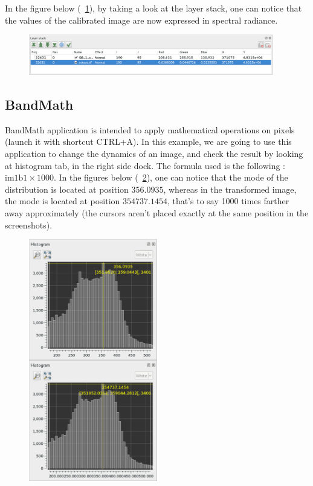 In the figure below (~\ref{fig:OC}), by taking a look at the layer stack, one can notice that the values of the calibrated image are now expressed in spectral radiance.


\begin{figure}[!h] 
  \center
  \includegraphics[width=0.95\textwidth]{../Art/MonteverdiImages/OC.png}
  \label{fig:OC}
\end{figure}



\subsection{BandMath}\label{ssec:monbandmath}

BandMath application is intended to apply mathematical operations on pixels (launch it with shortcut CTRL+A). In this example, we are going to use this application to change the dynamics of an image,
and check the result by looking at histogram tab, in the right side dock. The formula used is the following : $\text{im1b1} \times 1000$.
In the figures below (~\ref{fig:BM}), one can notice that the mode of the distribution is located at position $356.0935$, whereas in the transformed image,
the mode is located at position $354737.1454$, that's to say 1000 times farther away approximately (the cursors aren't placed exactly at the same position in the screenshots).


\begin{figure}[!h] 
  \center
  \includegraphics[width=0.5\textwidth]{../Art/MonteverdiImages/BM.png}
  \label{fig:BM}
\end{figure}


